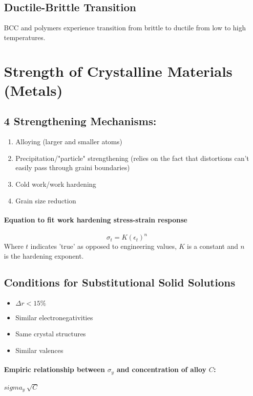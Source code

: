 \documentclass[a4paper,12pt]{report}
\begin{document}
\subsection{Ductile-Brittle Transition}
BCC and polymers experience transition from brittle to ductile from low to high temperatures. 




\section{Strength of Crystalline Materials (Metals)}
\subsection{4 Strengthening Mechanisms: }
\begin{enumerate}
\item Alloying (larger and smaller atoms)
\item Precipitation/"particle" strengthening (relies on the fact that distortions can't easily pass through graini boundaries)
\item Cold work/work hardening
\item Grain size reduction
\end{enumerate}

\paragraph{Equation to fit work hardening stress-strain response}
$$\sigma_t = K(\epsilon_t)^n$$
Where $t$ indicates 'true' as opposed to engineering values, $K$ is a constant and $n$ is the hardening exponent.

\subsection{Conditions for Substitutional Solid Solutions}
\begin{itemize}
\item $\Delta r < 15\%$
\item Similar electronegativities
\item Same crystal structures
\item Similar valences
\end{itemize}

\paragraph{Empiric relationship between $\sigma_y$ and concentration of alloy $C$: } $sigma_y ~ \sqrt{C}$
\end{document}
